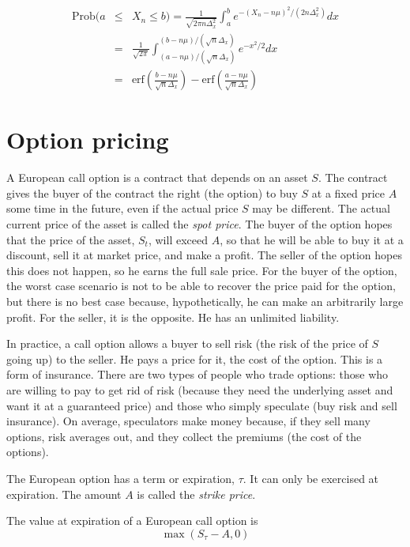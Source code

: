 \documentclass[justified, sixbynine]{tufte-book}
\theoremstyle{plain}%
\newtheorem * {corollary}{Corollary}
\theoremstyle{definition}
\theoremstyle{remark}
\newtheorem * {remark}{Remark}
\newtheorem * {note}{Note}
\begin{document}
\begin{fullwidth}
\begin{eqnarray}
\textrm{Prob}(a &\leq &X_n\leq b)=\frac 1{\sqrt{2\pi n\Delta _x^2}}\int_a^be^{-(X_n - n\mu)^2/(2n%
\Delta _x^2)}dx \\
&=&\frac 1{\sqrt{2\pi }}\int_{(a-n\mu)/(\sqrt{n}\Delta _x)}^{(b-n\mu)/(\sqrt{n}\Delta
_x)}e^{-x^2/2}dx \\
&=&\textrm{erf}(\frac {b-n\mu}{\sqrt{n}\Delta _x})-\textrm{erf}(\frac {a-n\mu}{\sqrt{n}\Delta
_x})
\end{eqnarray}

\goodbreak\section{Option pricing}

A European call option is a contract that depends on an asset $S$. The contract gives the buyer of the contract the right (the option) to buy $S$ at a fixed price $A$ some time in the future, even if the actual price $S$ may be different. The actual current price of the asset is called the {\it spot price}. The buyer of the option hopes that the price of the asset, $S_t$, will exceed $A$, so that he will be able to buy it at a discount, sell it at market price, and make a profit. The seller of the option hopes this does not happen, so he earns the full sale price. For the buyer of the option, the worst case scenario is not to be able to recover the price paid for the option, but there is no best case because, hypothetically, he can make an arbitrarily large profit. For the seller, it is the opposite. He has an unlimited liability.

In practice, a call option allows a buyer to sell risk (the risk of the price of $S$ going up) to the seller. He pays a price for it, the cost of the option. This is a form of insurance. There are two types of people who trade options: those who are willing to pay to get rid of risk (because they need the underlying asset and want it at a guaranteed price) and those who simply speculate (buy risk and sell insurance). On average, speculators make money because, if they sell many options, risk averages out, and they collect the premiums (the cost of the options).

The European option has a term or expiration, $\tau$. It can only be exercised at expiration. The amount $A$ is called the {\it strike price}.

The value at expiration of a European call option is
\begin{equation}
\max (S_\tau -A, 0)
\end{equation}


\end{fullwidth}
\end{document}
